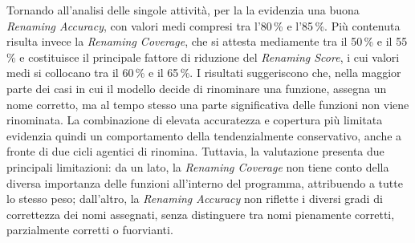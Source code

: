 Tornando all'analisi delle singole attività, per la \renaming{} la  evidenzia una buona \emph{Renaming Accuracy}, con valori medi compresi tra l'80\,\% e l'85\,\%. Più contenuta risulta invece la \emph{Renaming Coverage}, che si attesta mediamente tra il 50\,\% e il 55\,\% e costituisce il principale fattore di riduzione del \emph{Renaming Score}, i cui valori medi si collocano tra il 60\,\% e il 65\,\%. I risultati suggeriscono che, nella maggior parte dei casi in cui il modello decide di rinominare una funzione, assegna un nome corretto, ma al tempo stesso una parte significativa delle funzioni non viene rinominata. La combinazione di elevata accuratezza e copertura più limitata evidenzia quindi un comportamento della \reversing{} tendenzialmente conservativo, anche a fronte di due cicli agentici di rinomina. Tuttavia, la valutazione presenta due principali limitazioni: da un lato, la \emph{Renaming Coverage} non tiene conto della diversa importanza delle funzioni all'interno del programma, attribuendo a tutte lo stesso peso; dall'altro, la \emph{Renaming Accuracy} non riflette i diversi gradi di correttezza dei nomi assegnati, senza distinguere tra nomi pienamente corretti, parzialmente corretti o fuorvianti.


